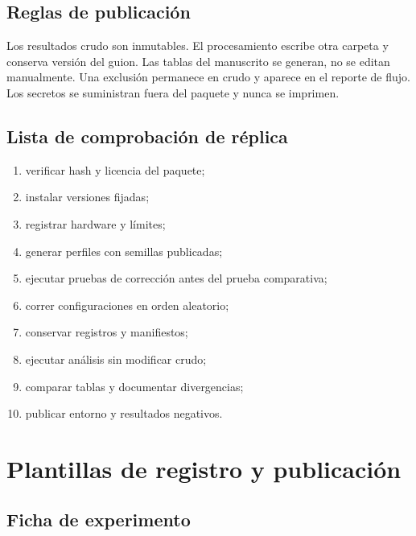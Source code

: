 \section{Reglas de publicación}

Los resultados crudo son inmutables. El procesamiento escribe otra carpeta y conserva
versión del guion. Las tablas del manuscrito se generan, no se editan manualmente. Una
exclusión permanece en crudo y aparece en el reporte de flujo. Los secretos se suministran
fuera del paquete y nunca se imprimen.

\section{Lista de comprobación de réplica}

\begin{enumerate}[leftmargin=*]
  \item verificar hash y licencia del paquete;
  \item instalar versiones fijadas;
  \item registrar hardware y límites;
  \item generar perfiles con semillas publicadas;
  \item ejecutar pruebas de corrección antes del prueba comparativa;
  \item correr configuraciones en orden aleatorio;
  \item conservar registros y manifiestos;
  \item ejecutar análisis sin modificar crudo;
  \item comparar tablas y documentar divergencias;
  \item publicar entorno y resultados negativos.
\end{enumerate}

\chapter{Plantillas de registro y publicación}

\section{Ficha de experimento}

